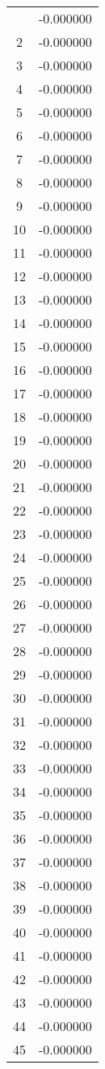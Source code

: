 \documentclass[12pt]{article}
\begin{document}
\begin{longtable}{@{}cc@{}}
\bottomrule
\endlastfoot
1 & -0.000000 \\
2 & -0.000000 \\
3 & -0.000000 \\
4 & -0.000000 \\
5 & -0.000000 \\
6 & -0.000000 \\
7 & -0.000000 \\
8 & -0.000000 \\
9 & -0.000000 \\
10 & -0.000000 \\
11 & -0.000000 \\
12 & -0.000000 \\
13 & -0.000000 \\
14 & -0.000000 \\
15 & -0.000000 \\
16 & -0.000000 \\
17 & -0.000000 \\
18 & -0.000000 \\
19 & -0.000000 \\
20 & -0.000000 \\
21 & -0.000000 \\
22 & -0.000000 \\
23 & -0.000000 \\
24 & -0.000000 \\
25 & -0.000000 \\
26 & -0.000000 \\
27 & -0.000000 \\
28 & -0.000000 \\
29 & -0.000000 \\
30 & -0.000000 \\
31 & -0.000000 \\
32 & -0.000000 \\
33 & -0.000000 \\
34 & -0.000000 \\
35 & -0.000000 \\
36 & -0.000000 \\
37 & -0.000000 \\
38 & -0.000000 \\
39 & -0.000000 \\
40 & -0.000000 \\
41 & -0.000000 \\
42 & -0.000000 \\
43 & -0.000000 \\
44 & -0.000000 \\
45 & -0.000000 \\

\end{longtable}
\end{document}
